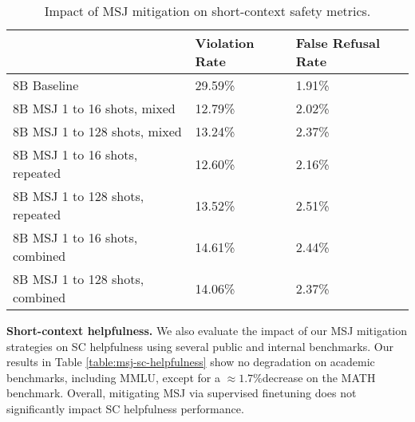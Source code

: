 \begin{table}
\centering

\begin{tabular}{| l | l | l |}
\hline
 & \textbf{Violation Rate} & \textbf{False Refusal Rate} \\
\hline
8B Baseline  & 29.59\% & 1.91\% \\

8B MSJ 1 to 16 shots, mixed  & 12.79\% & 2.02\% \\

8B MSJ 1 to 128 shots, mixed & 13.24\% & 2.37\% \\

8B MSJ 1 to 16 shots, repeated  & 12.60\% & 2.16\% \\

8B MSJ 1 to 128 shots, repeated  & 13.52\% & 2.51\% \\

8B MSJ 1 to 16 shots, combined  & 14.61\% & 2.44\% \\

8B MSJ 1 to 128 shots, combined  & 14.06\% & 2.37\% \\
\hline

\end{tabular}
\caption{Impact of MSJ mitigation on short-context safety metrics. \label{table:msj-sc-safety}}
\end{table}



\textbf{Short-context helpfulness.}
We also evaluate the impact of our MSJ mitigation strategies on SC helpfulness using several public and internal benchmarks. Our results in Table \ref{table:msj-sc-helpfulness} show no degradation on academic benchmarks, including MMLU, except for a $\approx1.7\%$decrease on the MATH benchmark. Overall, mitigating MSJ via supervised finetuning does not significantly impact SC helpfulness performance.


